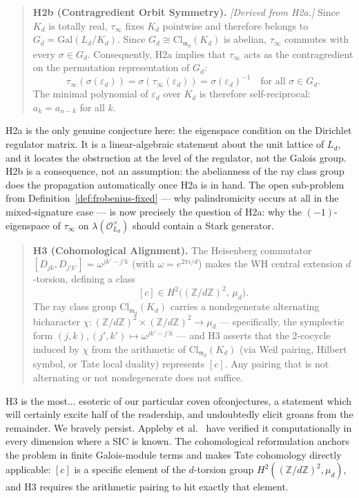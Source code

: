 \documentclass[12pt]{article}
\theoremstyle{plain}
\theoremstyle{definition}
\theoremstyle{remark}
\newcommand{\OO}{\mathcal{O}}
\newcommand{\eps}{\varepsilon}
\newcommand{\bZ}{\mathbb{Z}}
\begin{document}
\begin{quote}
\textbf{H2b (Contragredient Orbit Symmetry).} \emph{[Derived from H2a.]} Since $K_d$ is totally real, $\tau_\infty$ fixes $K_d$ pointwise and therefore belongs to $G_d = \mathrm{Gal}(L_d/K_d)$. Since $G_d \cong \mathrm{Cl}_{\mathfrak{m}_d}(K_d)$ is abelian, $\tau_\infty$ commutes with every $\sigma \in G_d$. Consequently, H2a implies that $\tau_\infty$ acts as the contragredient on the permutation representation of $G_d$:
\[
  \tau_\infty(\sigma(\eps_d)) = \sigma(\tau_\infty(\eps_d)) = \sigma(\eps_d)^{-1} \quad \text{for all } \sigma \in G_d.
\]
The minimal polynomial of $\eps_d$ over $K_d$ is therefore self-reciprocal: $a_k = a_{n-k}$ for all $k$.
\end{quote}

H2a is the only genuine conjecture here: the eigenspace condition on the Dirichlet regulator matrix. It is a linear-algebraic statement about the unit lattice of $L_d$, and it locates the obstruction at the level of the regulator, not the Galois group. H2b is a consequence, not an assumption: the abelianness of the ray class group does the propagation automatically once H2a is in hand. The open sub-problem from Definition~\ref{def:frobenius-fixed} — why palindromicity occurs at all in the mixed-signature case — is now precisely the question of H2a: why the $(-1)$-eigenspace of $\tau_\infty$ on $\lambda(\OO_{L_d}^\times)$ should contain a Stark generator.

\begin{quote}
\textbf{H3 (Cohomological Alignment).} The Heisenberg commutator $[D_{jk}, D_{j'k'}] = \omega^{jk'-j'k}$ (with $\omega = e^{2\pi i/d}$) makes the WH central extension $d$-torsion, defining a class
\[
  [c] \in H^2\!\bigl((\bZ/d\bZ)^2,\, \mu_d\bigr).
\]
The ray class group $\mathrm{Cl}_{\mathfrak{m}_d}(K_d)$ carries a nondegenerate alternating bicharacter $\chi: (\bZ/d\bZ)^2 \times (\bZ/d\bZ)^2 \to \mu_d$ — specifically, the symplectic form $(j,k),(j',k') \mapsto \omega^{jk'-j'k}$ — and H3 asserts that the 2-cocycle induced by $\chi$ from the arithmetic of $\mathrm{Cl}_{\mathfrak{m}_d}(K_d)$ (via Weil pairing, Hilbert symbol, or Tate local duality) represents $[c]$. Any pairing that is not alternating or not nondegenerate does not suffice.
\end{quote}

H3 is the most... esoteric of our particular coven ofconjectures, a statement which will certainly excite half of the readership, and undoubtedly elicit groans from the remainder. We bravely persist. Appleby et al.\ \cite{afmy2017} have verified it computationally in every dimension where a SIC is known. The cohomological reformulation anchors the problem in finite Galois-module terms and makes Tate cohomology directly applicable: $[c]$ is a specific element of the $d$-torsion group $H^2((\bZ/d\bZ)^2, \mu_d)$, and H3 requires the arithmetic pairing to hit exactly that element.
\end{document}
